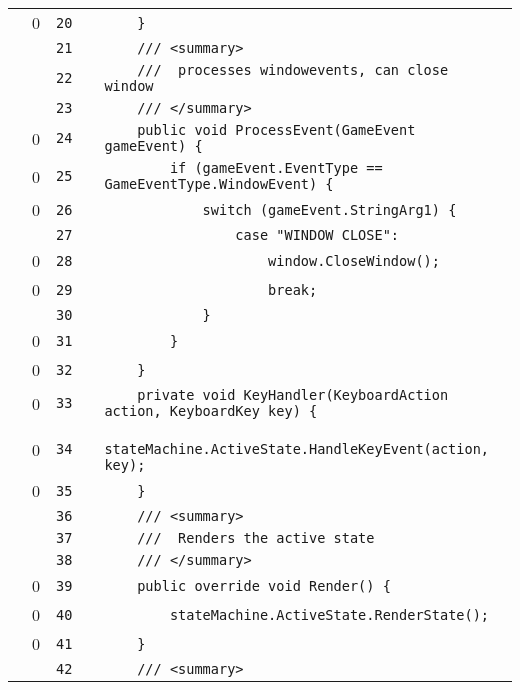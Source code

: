 \documentclass[a4paper,landscape,10pt]{article}
\begin{document}
\begin{longtable}[l]{lrrll}
\cellcolor{red} & 0 & \verb~20~ & & \verb~    }~\\
\cellcolor{gray} &  & \verb~21~ & & \verb~    /// <summary>~\\
\cellcolor{gray} &  & \verb~22~ & & \verb~    ///  processes windowevents, can close window~\\
\cellcolor{gray} &  & \verb~23~ & & \verb~    /// </summary>~\\
\cellcolor{red} & 0 & \verb~24~ & & \verb~    public void ProcessEvent(GameEvent gameEvent) {~\\
\cellcolor{red} & 0 & \verb~25~ & & \verb~        if (gameEvent.EventType == GameEventType.WindowEvent) {~\\
\cellcolor{red} & 0 & \verb~26~ & & \verb~            switch (gameEvent.StringArg1) {~\\
\cellcolor{gray} &  & \verb~27~ & & \verb~                case "WINDOW CLOSE":~\\
\cellcolor{red} & 0 & \verb~28~ & & \verb~                    window.CloseWindow();~\\
\cellcolor{red} & 0 & \verb~29~ & & \verb~                    break;~\\
\cellcolor{gray} &  & \verb~30~ & & \verb~            }~\\
\cellcolor{red} & 0 & \verb~31~ & & \verb~        }~\\
\cellcolor{red} & 0 & \verb~32~ & & \verb~    }~\\
\cellcolor{red} & 0 & \verb~33~ & & \verb~    private void KeyHandler(KeyboardAction action, KeyboardKey key) {~\\
\cellcolor{red} & 0 & \verb~34~ & & \verb~        stateMachine.ActiveState.HandleKeyEvent(action, key);~\\
\cellcolor{red} & 0 & \verb~35~ & & \verb~    }~\\
\cellcolor{gray} &  & \verb~36~ & & \verb~    /// <summary>~\\
\cellcolor{gray} &  & \verb~37~ & & \verb~    ///  Renders the active state~\\
\cellcolor{gray} &  & \verb~38~ & & \verb~    /// </summary>~\\
\cellcolor{red} & 0 & \verb~39~ & & \verb~    public override void Render() {~\\
\cellcolor{red} & 0 & \verb~40~ & & \verb~        stateMachine.ActiveState.RenderState();~\\
\cellcolor{red} & 0 & \verb~41~ & & \verb~    }~\\
\cellcolor{gray} &  & \verb~42~ & & \verb~    /// <summary>~\\

\end{longtable}
\end{document}
